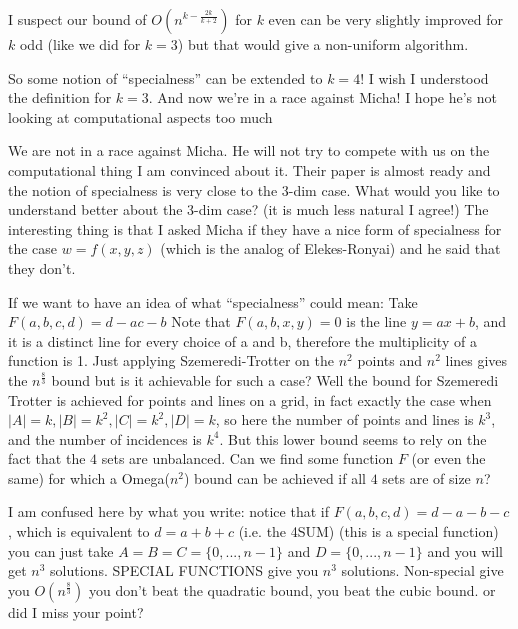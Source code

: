 \begin{displayquote}
I suspect our bound of
$O(n^{k - \frac{2k}{k+2}})$ for $k$ even can be very slightly improved for $k$ odd
(like we did for $k=3$) but that would give a non-uniform algorithm.
\end{displayquote}

\begin{displayquote}
So some notion of ``specialness'' can be extended to $k=4$! I wish I
understood the definition for $k=3$.
And now we're in a race against Micha! I hope he's not looking at
computational aspects too much
\end{displayquote}

We are not in a race against Micha. He will not try to compete with us on
the computational thing I am convinced about it.
Their paper is almost
ready and the notion of specialness is very close to the 3-dim case. What
would you like to understand better about the 3-dim case? (it is much less
natural I agree!) The interesting thing is that I asked Micha if they have
a nice form of specialness for the case $w=f(x,y,z)$ (which is the analog of
Elekes-Ronyai) and he said that they don't.

\begin{displayquote}
If we want to have an idea of what ``specialness'' could mean:
Take $F(a,b,c,d) = d-ac-b$
Note that $F(a,b,x,y)=0$ is the line $y=ax+b$, and it is a distinct line
for every choice of a and b, therefore the multiplicity of a function
is 1. Just applying Szemeredi-Trotter on the $n^2$ points and $n^2$ lines
gives the $n^{\frac{8}{3}}$ bound but is it achievable for such a case? Well the
bound for Szemeredi Trotter is achieved for points and lines on a
grid, in fact exactly the case when
$|A|=k, |B|=k^2, |C|=k^2, |D|=k$, so here the number of points and lines
is $k^3$, and the number of incidences is $k^4$.
But this lower bound seems to rely on the fact that the $4$ sets are
unbalanced. Can we find some function $F$ (or even the same) for which a
Omega($n^2$) bound can be achieved if all $4$ sets are of size $n$?
\end{displayquote}

I am confused here by what you write: notice that if
$F(a,b,c,d)=d-a-b-c$,
which is equivalent to $d=a+b+c$ (i.e. the 4SUM) (this is a special
function) you can just take $A=B=C=\{0,...,n-1\}$ and $D=\{0,...,n-1\}$ and you
will get $n^3$ solutions. SPECIAL FUNCTIONS give you $n^3$ solutions.
Non-special give you $O(n^{\frac{8}{3}})$ you don't beat the quadratic bound,
you beat the cubic bound. or did I miss your point?

